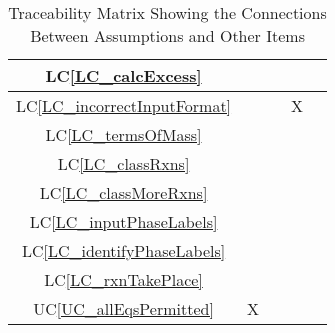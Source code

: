 \documentclass[12pt]{article}
\newcommand{\lcref}[1]{LC\ref{#1}}
\newcommand{\ucref}[1]{UC\ref{#1}}
\begin{document}
\begin{table}[h!]
{\begin{tabular}{|c|c|c|c|c|}
      \lcref{LC_calcExcess}           &                       &                     &                             &                      \\ \hline
      \lcref{LC_incorrectInputFormat} &                       &                     & X                           &                      \\ \hline
      \lcref{LC_termsOfMass}          &                       &                     &                             &                      \\ \hline
      \lcref{LC_classRxns}            &                       &                     &                             &                      \\ \hline
      \lcref{LC_classMoreRxns}        &                       &                     &                             &                      \\ \hline
      \lcref{LC_inputPhaseLabels}     &                       &                     &                             &                      \\ \hline
      \lcref{LC_identifyPhaseLabels}  &                       &                     &                             &                      \\ \hline
      \lcref{LC_rxnTakePlace}         &                       &                     &                             &                      \\ \hline
      \ucref{UC_allEqsPermitted}      & X                     &                     &                             &                      \\ \hline
    \end{tabular}
    \caption{Traceability Matrix Showing the Connections Between Assumptions and Other Items}
    \label{Table:A_trace}
  }
\end{table}

\newpage


\end{document}
